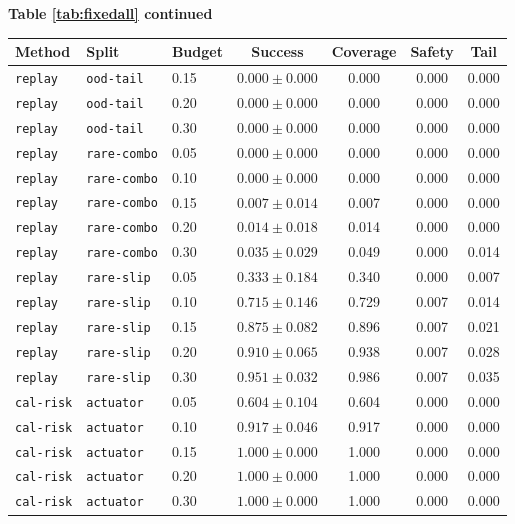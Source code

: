 \documentclass{article}
\begin{document}
\begin{center}
\textbf{Table \ref{tab:fixedall} continued}\\[0.4ex]
\begin{tabular}{lllcccc}
\toprule
Method & Split & Budget & Success & Coverage & Safety & Tail \\
\midrule
\texttt{replay} & \texttt{ood-tail} & 0.15 & $0.000 \pm 0.000$ & 0.000 & 0.000 & 0.000 \\
\texttt{replay} & \texttt{ood-tail} & 0.20 & $0.000 \pm 0.000$ & 0.000 & 0.000 & 0.000 \\
\texttt{replay} & \texttt{ood-tail} & 0.30 & $0.000 \pm 0.000$ & 0.000 & 0.000 & 0.000 \\
\texttt{replay} & \texttt{rare-combo} & 0.05 & $0.000 \pm 0.000$ & 0.000 & 0.000 & 0.000 \\
\texttt{replay} & \texttt{rare-combo} & 0.10 & $0.000 \pm 0.000$ & 0.000 & 0.000 & 0.000 \\
\texttt{replay} & \texttt{rare-combo} & 0.15 & $0.007 \pm 0.014$ & 0.007 & 0.000 & 0.000 \\
\texttt{replay} & \texttt{rare-combo} & 0.20 & $0.014 \pm 0.018$ & 0.014 & 0.000 & 0.000 \\
\texttt{replay} & \texttt{rare-combo} & 0.30 & $0.035 \pm 0.029$ & 0.049 & 0.000 & 0.014 \\
\texttt{replay} & \texttt{rare-slip} & 0.05 & $0.333 \pm 0.184$ & 0.340 & 0.000 & 0.007 \\
\texttt{replay} & \texttt{rare-slip} & 0.10 & $0.715 \pm 0.146$ & 0.729 & 0.007 & 0.014 \\
\texttt{replay} & \texttt{rare-slip} & 0.15 & $0.875 \pm 0.082$ & 0.896 & 0.007 & 0.021 \\
\texttt{replay} & \texttt{rare-slip} & 0.20 & $0.910 \pm 0.065$ & 0.938 & 0.007 & 0.028 \\
\texttt{replay} & \texttt{rare-slip} & 0.30 & $0.951 \pm 0.032$ & 0.986 & 0.007 & 0.035 \\
\texttt{cal-risk} & \texttt{actuator} & 0.05 & $0.604 \pm 0.104$ & 0.604 & 0.000 & 0.000 \\
\texttt{cal-risk} & \texttt{actuator} & 0.10 & $0.917 \pm 0.046$ & 0.917 & 0.000 & 0.000 \\
\texttt{cal-risk} & \texttt{actuator} & 0.15 & $1.000 \pm 0.000$ & 1.000 & 0.000 & 0.000 \\
\texttt{cal-risk} & \texttt{actuator} & 0.20 & $1.000 \pm 0.000$ & 1.000 & 0.000 & 0.000 \\
\texttt{cal-risk} & \texttt{actuator} & 0.30 & $1.000 \pm 0.000$ & 1.000 & 0.000 & 0.000 \\

\end{tabular}
\end{center}
\end{document}
